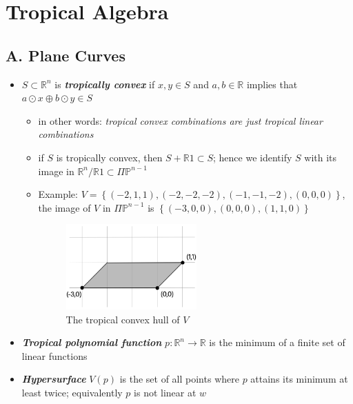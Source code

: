 \documentclass{article}
\begin{document}
\section*{Tropical Algebra}

\subsection*{A. Plane Curves}

\begin{itemize}
	\item \( S \subset \mathbb{R}^n \) is \textbf{\textit{tropically convex}} if \( x,y \in S \) and \( a,b \in \mathbb{R} \) implies that \( a \odot x \oplus b \odot y \in S \)
	\begin{itemize}
		\item in other words: \emph{tropical convex combinations are just tropical linear combinations}
		\item if \( S \) is tropically convex, then \( S + \mathbb{R} 1 \subset S \); hence we identify \( S \) with its image in \( \mathbb{R}^n / \mathbb{R}1 \subset \Pi \mathbb{P}^{n-1} \)
  	\item Example: \( V = \left\{ (-2,1,1), (-2,-2,-2), (-1,-1,-2), (0,0,0) \right\} \), the image of \( V \) in \( \Pi \mathbb{P}^{n-1} \) is \( \left\{ (-3,0,0), (0,0,0), (1,1, 0) \right\} \)
   
		\begin{figure}[H]
			\centering
			\includegraphics[width=5cm]{graphics/convex_hull_1.jpg}
			\caption{The tropical convex hull of \( V \)}
		\end{figure}
	\end{itemize}

	\item \textbf{\textit{Tropical polynomial function}} \( p: \mathbb{R}^n \to \mathbb{R} \) is the minimum of a finite set of linear functions 
 	\item \textbf{\textit{Hypersurface}} \( V(p) \) is the set of all points where \( p \) attains its minimum at least twice; equivalently \( p \) is not linear at \( w \)
 
\end{itemize}
\end{document}
